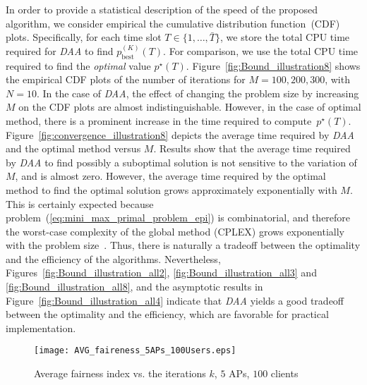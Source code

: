 \documentclass[journal, 10pt, twocolumn]{IEEEtran}
\begin{document}
In order to provide a statistical description of the speed of
the proposed algorithm, we consider empirical the cumulative distribution function~(CDF) plots. Specifically, for each time slot $T\in\{1,\ldots,\bar{T}\}$, we store the total CPU time required for \emph{DAA} to find $p^{(K)}_{\mathrm{best}}(T)$. For comparison, we use the total CPU time required to find the \emph{optimal} value $p^\star(T)$. Figure~\ref{fig:Bound_illustration8} shows the empirical CDF plots of the number of iterations for $M=100,200,300$, with $N=10$. In the case of \emph{DAA}, the effect of changing the problem size by increasing $M$ on the CDF plots are almost indistinguishable. However, in the case of optimal method, there is a prominent increase in the time required to compute~$p^\star(T)$. Figure~\ref{fig:convergence_illustration8} depicts the average time required by \emph{DAA} and the optimal method versus $M$. Results show that the average time required by \emph{DAA} to find possibly a suboptimal solution is not sensitive to the variation of $M$, and is almost zero. However, the average time required by the optimal method to find the optimal solution grows approximately exponentially with $M$. This is certainly expected because problem~(\ref{eq:mini_max_primal_problem_epi}) is combinatorial, and therefore the worst-case complexity of the global method (CPLEX) grows exponentially with the problem size~\cite[\S~1.4.2]{Boyd-Vandenberghe-04}. Thus, there is naturally a tradeoff between the optimality and the efficiency of the algorithms. Nevertheless, Figures~\ref{fig:Bound_illustration_all2}, \ref{fig:Bound_illustration_all3} and \ref{fig:Bound_illustration_all8}, and the asymptotic results in Figure~\ref{fig:Bound_illustration_all4} indicate that \emph{DAA} yields a good tradeoff between the
optimality and the efficiency, which are favorable for practical implementation.


\begin{figure}[t]
\centering
{\texttt{[image: AVG\_faireness\_5APs\_100Users.eps]}}\vspace{-2mm}
\caption{Average fairness index vs. the iterations $k$, $5$ APs, $100$ clients}
\label{fig:Bound_illustration_all6}
\vspace{-0.4cm}
\end{figure}
\end{document}
